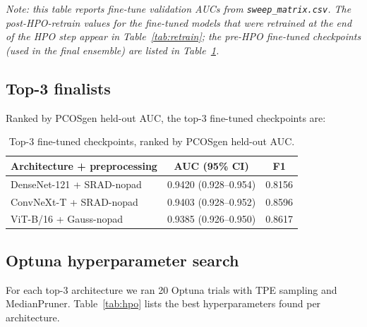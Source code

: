 \documentclass[11pt,twocolumn]{article}
\newcommand{\PCOS}{PCOS}
\newcommand{\SRAD}{SRAD}
\newcommand{\AUC}{AUC}
\begin{document}
\noindent\textit{Note: this table reports fine-tune validation \AUC{}s
from \texttt{sweep\_matrix.csv}. The post-HPO-retrain values for the
fine-tuned models that were retrained at the end of the HPO step appear
in Table~\ref{tab:retrain}; the pre-HPO fine-tuned checkpoints (used in
the final ensemble) are listed in Table~\ref{tab:top3}.}

\subsection{Top-3 finalists}

Ranked by \PCOS{}gen held-out \AUC{}, the top-3 fine-tuned checkpoints
are:

\begin{table}[t]
  \centering
  \caption{Top-3 fine-tuned checkpoints, ranked by \PCOS{}gen held-out
           \AUC{}.}
  \label{tab:top3}
  \begin{tabular}{lcc}
    \toprule
    Architecture + preprocessing & \AUC{} (95\% CI) & F1 \\
    \midrule
    DenseNet-121 + \SRAD{}-nopad   & 0.9420 (0.928--0.954) & 0.8156 \\
    ConvNeXt-T + \SRAD{}-nopad     & 0.9403 (0.928--0.952) & 0.8596 \\
    ViT-B/16 + Gauss-nopad         & 0.9385 (0.926--0.950) & 0.8617 \\
    \bottomrule
  \end{tabular}
\end{table}

\subsection{Optuna hyperparameter search}

For each top-3 architecture we ran 20 Optuna trials with TPE sampling and
MedianPruner. Table~\ref{tab:hpo} lists the best hyperparameters found per
architecture.
\end{document}
